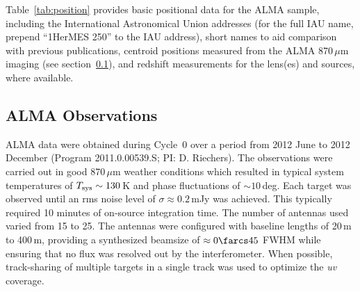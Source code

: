 \documentclass[iop]{emulateapj}
\begin{document}

Table~\ref{tab:position} provides basic positional data for the ALMA sample,
including the International Astronomical Union addresses (for the full IAU
name, prepend ``1HerMES 250'' to the IAU address), short names to aid
comparison with previous publications, centroid positions measured from the
ALMA 870$\, \mu$m imaging (see section~\ref{sec:almaobs}), and redshift
measurements for the lens(es) and sources, where available.



\subsection{ALMA Observations}\label{sec:almaobs}

ALMA data were obtained during Cycle~0 over a period from 2012 June to 2012
December (Program 2011.0.00539.S; PI: D. Riechers).  The observations were
carried out in good 870$\,\mu$m weather conditions which resulted in typical
system temperatures of $T_{\rm sys} \sim 130\,$K and phase fluctuations of
$\sim 10\,$deg.  Each target was observed until an rms noise level of $\sigma
\approx 0.2\,$mJy was achieved.  This typically required 10 minutes of
on-source integration time.  The number of antennas used varied from 15 to 25.
The antennas were configured with baseline lengths of 20$\,$m to 400$\,$m,
providing a synthesized beamsize of $\approx 0\farcs45$ FWHM while ensuring
that no flux was resolved out by the interferometer.  When possible,
track-sharing of multiple targets in a single track was used to optimize the
{\it uv} coverage.
\end{document}
